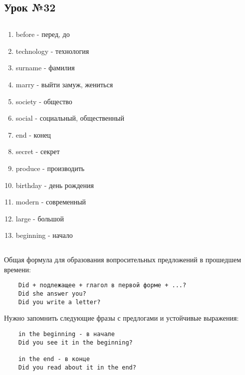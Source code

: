 \subsection{Урок №32}

\subsection*{}
\begin{multicols}{2}
    \begin{enumerate}\setlength{\itemsep}{0pt}
        \item before - перед, до
        \item technology - технология
        \item surname - фамилия
        \item marry - выйти замуж, жениться
        \item society - общество
        \item social - социальный, общественный
        \item end - конец
        \item secret - секрет
        \item produce - производить
        \item birthday - день рождения
        \item modern - современный
        \item large - большой
        \item beginning - начало
    \end{enumerate}
\end{multicols}

\subsection*{}
Общая формула для образования вопросительных предложений в прошедшем времени:
\begin{verbatim}
    Did + подлежащее + глагол в первой форме + ...?
    Did she answer you?
    Did you write a letter?
\end{verbatim}

Нужно запомнить следующие фразы с предлогами и устойчивые выражения:
\begin{verbatim}
    in the beginning - в начале
    Did you see it in the beginning?

    in the end - в конце
    Did you read about it in the end?
\end{verbatim}
